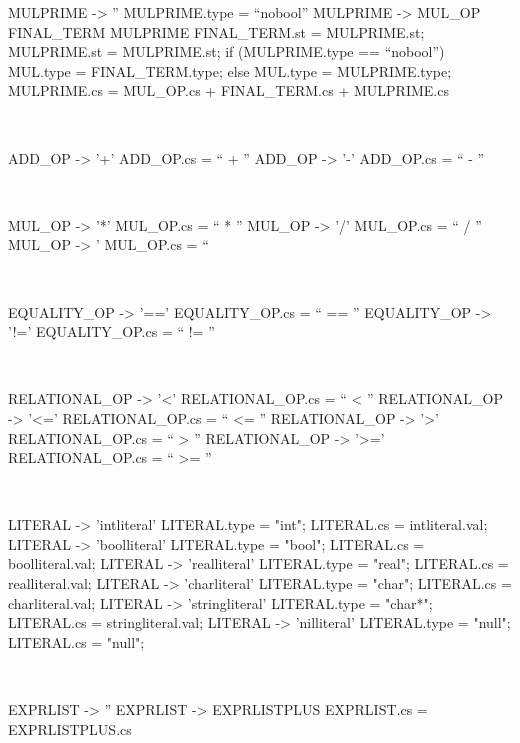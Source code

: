 \begin{verbbox}[\scriptsize]
MULPRIME -> ''
{
MULPRIME.type = “nobool”
}
MULPRIME -> MUL_OP FINAL_TERM MULPRIME
{
FINAL_TERM.st = MULPRIME.st;
MULPRIME.st = MULPRIME.st;
if (MULPRIME.type == “nobool”) {
    MUL.type = FINAL_TERM.type;
} else {
    MUL.type = MULPRIME.type;
}
MULPRIME.cs = MUL_OP.cs + FINAL_TERM.cs + MULPRIME.cs
}
\end{verbbox} 
\theverbbox\\

\begin{verbbox}[\scriptsize]
ADD_OP -> '+'
{
ADD_OP.cs = “ + ”
}
ADD_OP -> '-'
{
ADD_OP.cs = “ - ”
}
\end{verbbox} 
\theverbbox\\

\begin{verbbox}[\scriptsize]
MUL_OP -> '*'
{
MUL_OP.cs = “ * ”
}
MUL_OP -> '/'
{
MUL_OP.cs = “ / ”
}
MUL_OP -> '%
{
MUL_OP.cs = “ %
}
\end{verbbox} 
\theverbbox\\

\begin{verbbox}[\scriptsize]
EQUALITY_OP -> '=='
{
EQUALITY_OP.cs = “ == ”
}
EQUALITY_OP -> '!='
{
EQUALITY_OP.cs = “ != ”
}
\end{verbbox} 
\theverbbox\\

\begin{verbbox}[\scriptsize]
RELATIONAL_OP -> '<'
{
RELATIONAL_OP.cs = “ < ”
}
RELATIONAL_OP -> '<='
{
RELATIONAL_OP.cs = “ <= ”
}
RELATIONAL_OP -> '>'
{
RELATIONAL_OP.cs = “ > ”
}
RELATIONAL_OP -> '>='
{
RELATIONAL_OP.cs = “ >= ”
}
\end{verbbox} 
\theverbbox\\

\begin{verbbox}[\scriptsize]
LITERAL -> 'intliteral'
{
LITERAL.type = "int";
LITERAL.cs = intliteral.val;
}
LITERAL -> 'boolliteral'
{
LITERAL.type =  "bool";
LITERAL.cs = boolliteral.val;
}
LITERAL -> 'realliteral'
{
LITERAL.type = "real";
LITERAL.cs = realliteral.val;
}
LITERAL -> 'charliteral'
{
LITERAL.type = "char";
LITERAL.cs = charliteral.val;
}
LITERAL -> 'stringliteral'
{
LITERAL.type = "char*";
LITERAL.cs = stringliteral.val;
}
LITERAL -> 'nilliteral'
{
LITERAL.type = "null";
LITERAL.cs = "null";
}
\end{verbbox} 
\theverbbox\\

\begin{verbbox}[\scriptsize]
EXPRLIST -> '' {}
EXPRLIST -> EXPRLISTPLUS
{
EXPRLIST.cs = EXPRLISTPLUS.cs
}
\end{verbbox} 
\theverbbox\\

